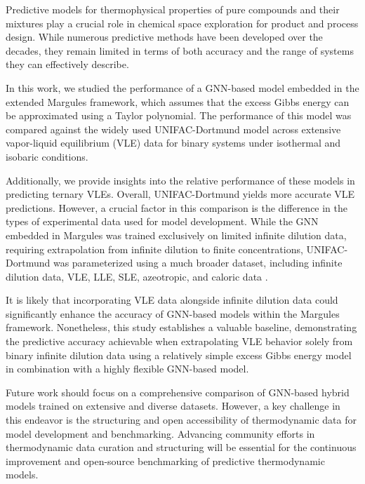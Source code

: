 \label{sec:conclusions}

Predictive models for thermophysical properties of pure compounds and their mixtures play a crucial role in chemical space exploration for product and process design. While numerous predictive methods have been developed over the decades, they remain limited in terms of both accuracy and the range of systems they can effectively describe.

In this work, we studied the performance of a GNN-based model embedded in the extended Margules framework, which assumes that the excess Gibbs energy can be approximated using a Taylor polynomial. The performance of this model was compared against the widely used UNIFAC-Dortmund model across extensive vapor-liquid equilibrium (VLE) data for binary systems under isothermal and isobaric conditions.

Additionally, we provide insights into the relative performance of these models in predicting ternary VLEs. Overall, UNIFAC-Dortmund yields more accurate VLE predictions. However, a crucial factor in this comparison is the difference in the types of experimental data used for model development. While the GNN embedded in Margules was trained exclusively on limited infinite dilution data, requiring extrapolation from infinite dilution to finite concentrations, UNIFAC-Dortmund was parameterized using a much broader dataset, including infinite dilution data, VLE, LLE, SLE, azeotropic, and caloric data \cite{constantinescu2016further,gmehling2002modified}.

It is likely that incorporating VLE data alongside infinite dilution data could significantly enhance the accuracy of GNN-based models within the Margules framework. Nonetheless, this study establishes a valuable baseline, demonstrating the predictive accuracy achievable when extrapolating VLE behavior solely from binary infinite dilution data using a relatively simple excess Gibbs energy model in combination with a highly flexible GNN-based model.

Future work should focus on a comprehensive comparison of GNN-based hybrid models trained on extensive and diverse datasets. However, a key challenge in this endeavor is the structuring and open accessibility of thermodynamic data for model development and benchmarking. Advancing community efforts in thermodynamic data curation and structuring will be essential for the continuous improvement and open-source benchmarking of predictive thermodynamic models.


